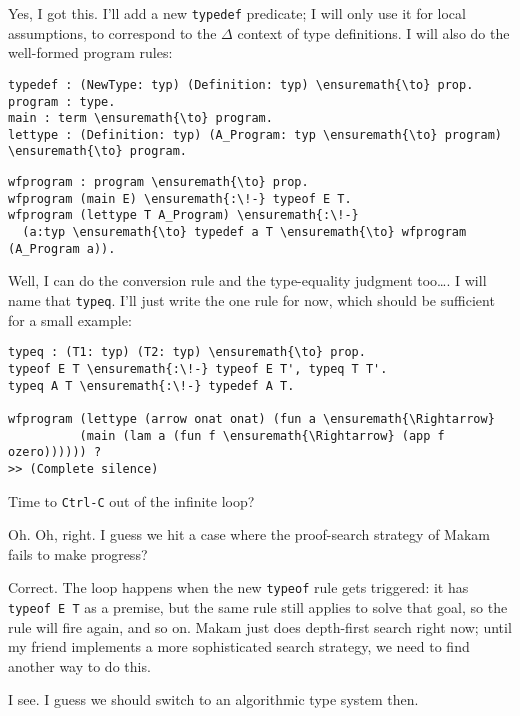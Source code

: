 \heroSTUDENT{} Yes, I got this. I'll add a new \texttt{typedef} predicate; I
will only use it for local assumptions, to correspond to the \(\Delta\)
context of type definitions. I will also do the well-formed program
rules:

\begin{verbatim}
typedef : (NewType: typ) (Definition: typ) \ensuremath{\to} prop.
program : type. 
main : term \ensuremath{\to} program. 
lettype : (Definition: typ) (A_Program: typ \ensuremath{\to} program) \ensuremath{\to} program.
\end{verbatim}

\importantCodeblock{}

\begin{verbatim}
wfprogram : program \ensuremath{\to} prop.
wfprogram (main E) \ensuremath{:\!-} typeof E T.
wfprogram (lettype T A_Program) \ensuremath{:\!-}
  (a:typ \ensuremath{\to} typedef a T \ensuremath{\to} wfprogram (A_Program a)).
\end{verbatim}

\importantCodeblockEnd{}

\noindent
Well, I can do the conversion rule and the type-equality judgment
too\ldots{}. I will name that \texttt{typeq}. I'll just write the one
rule for now, which should be sufficient for a small example:

\begin{verbatim}
typeq : (T1: typ) (T2: typ) \ensuremath{\to} prop.
typeof E T \ensuremath{:\!-} typeof E T', typeq T T'.
typeq A T \ensuremath{:\!-} typedef A T.

wfprogram (lettype (arrow onat onat) (fun a \ensuremath{\Rightarrow}
          (main (lam a (fun f \ensuremath{\Rightarrow} (app f ozero)))))) ?
>> (Complete silence)
\end{verbatim}

\heroADVISOR{} Time to \texttt{Ctrl-C} out of the infinite loop?

\heroSTUDENT{} Oh. Oh, right. I guess we hit a case where the proof-search
strategy of Makam fails to make progress?

\heroADVISOR{} Correct. The loop happens when the new \texttt{typeof} rule
gets triggered: it has \texttt{typeof\ E\ T\textquotesingle{}} as a
premise, but the same rule still applies to solve that goal, so the rule
will fire again, and so on. Makam just does depth-first search right
now; until my friend implements a more sophisticated search strategy, we
need to find another way to do this.

\heroSTUDENT{} I see. I guess we should switch to an algorithmic type system
then.

